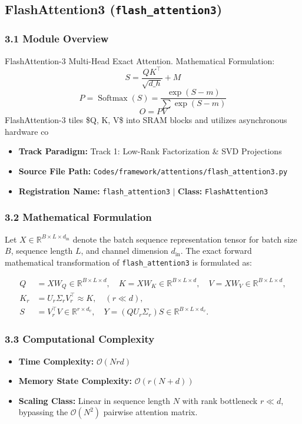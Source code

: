 \subsection{FlashAttention3 (\texttt{flash\_attention3})}
\label{sec:app_module_flash_attention3}

\subsubsection*{3.1 Module Overview}
FlashAttention-3 Multi-Head Exact Attention.  Mathematical Formulation:     $$S = \frac{Q K^\top}{\sqrt{d\_h}} + M$$     $$P = \operatorname{Softmax}(S) = \frac{\exp(S - m)}{\sum \exp(S - m)}$$     $$O = P V$$     FlashAttention-3 tiles \$Q, K, V\$ into SRAM blocks and utilizes asynchronous hardware co
\begin{itemize}
    \item \textbf{Track Paradigm:} Track 1: Low-Rank Factorization & SVD Projections
    \item \textbf{Source File Path:} \texttt{Codes/framework/attentions/flash\_attention3.py}
    \item \textbf{Registration Name:} \texttt{flash\_attention3} $\mid$ \textbf{Class:} \texttt{FlashAttention3}
\end{itemize}

\subsubsection*{3.2 Mathematical Formulation}
Let $X \in \mathbb{R}^{B \times L \times d_{\text{in}}}$ denote the batch sequence representation tensor for batch size $B$, sequence length $L$, and channel dimension $d_{\text{in}}$. The exact forward mathematical transformation of \texttt{flash\_attention3} is formulated as:

\begin{align}
Q &= X W_Q \in \mathbb{R}^{B \times L \times d}, \quad K = X W_K \in \mathbb{R}^{B \times L \times d}, \quad V = X W_V \in \mathbb{R}^{B \times L \times d}, \\
K_r &= U_r \Sigma_r V_r^\top \approx K, \quad (r \ll d), \\
S &= V_r^\top V \in \mathbb{R}^{r \times d_v}, \quad Y = (Q U_r \Sigma_r) S \in \mathbb{R}^{B \times L \times d_v}.
\end{align}


\subsubsection*{3.3 Computational Complexity}
\begin{itemize}
    \item \textbf{Time Complexity:} $\mathcal{O}(N r d)$
    \item \textbf{Memory State Complexity:} $\mathcal{O}(r(N + d))$
    \item \textbf{Scaling Class:} Linear in sequence length $N$ with rank bottleneck $r \ll d$, bypassing the $\mathcal{O}(N^2)$ pairwise attention matrix.
\end{itemize}

